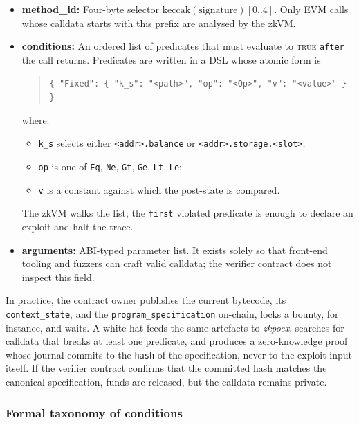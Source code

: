 \begin{itemize}
  \item \textbf{method\_id:} Four-byte selector \(\text{keccak}(\text{signature})[0..4]\).
        Only EVM calls whose calldata starts with this prefix are analysed by the
        zkVM.
  \item \textbf{conditions:} An ordered list of predicates that must evaluate to
        \textsc{true} \texttt{after} the call returns.  
        Predicates are written in a DSL whose atomic form is
            \begin{quote}
    \verb|{ "Fixed": { "k_s": "<path>", "op": "<Op>", "v": "<value>" } }|
            \end{quote}
        where:

        \begin{itemize}
           \item \verb|k_s| selects either
                 \texttt{<addr>.balance} or
                 \texttt{<addr>.storage.<slot>};
           \item \verb|op| is one of
                 \texttt{Eq}, \texttt{Ne}, \texttt{Gt}, \texttt{Ge},
                 \texttt{Lt}, \texttt{Le};
           \item \verb|v| is a constant against which the post-state is compared.
        \end{itemize}
        The zkVM walks the list; the \texttt{first} violated predicate is enough to declare an exploit and halt the trace.
  \item \textbf{arguments:} ABI-typed parameter list.  
        It exists solely so that front-end tooling and fuzzers can craft valid
        calldata; the verifier contract does not inspect this field.
\end{itemize}

In practice, the contract owner publishes the current bytecode, its
\texttt{context\_state}, and the \texttt{program\_specification} on-chain,
locks a bounty, for instance, and waits.  
A white-hat feeds the same artefacts to \textit{zkpoex}, searches for calldata
that breaks at least one predicate, and produces a zero-knowledge proof whose
journal commits to the \texttt{hash} of the specification, never to the exploit
input itself.  
If the verifier contract confirms that the committed hash matches the
canonical specification, funds are released, but the calldata remains private.


\subsubsection{Formal taxonomy of conditions}\label{zkpoex_formal_conditions}

